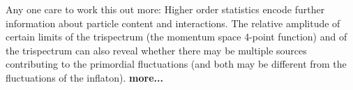 
{\color{blue} Any one care to work this out more:} 
Higher order statistics encode further information about particle content and interactions. The relative amplitude of certain limits of the trispectrum (the momentum space 4-point function) and of the trispectrum can also reveal whether there may be multiple sources contributing to the primordial fluctuations (and both may be different from the fluctuations of the inflaton). {\bf more...}




